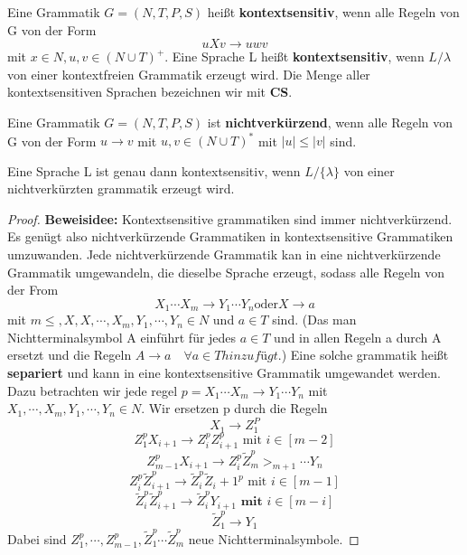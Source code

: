     Eine Grammatik \(G = (N, T, P, S)\) heißt \textbf{kontextsensitiv}, wenn alle Regeln von G von der Form 
    \[
        uXv \to uwv    
    \]
    mit \(x \in N, u,v \in (N \cup T)^+\). Eine Sprache L heißt \textbf{kontextsensitiv}, wenn \(L/{\lambda}\) von einer kontextfreien Grammatik erzeugt wird. Die Menge aller kontextsensitiven Sprachen bezeichnen wir mit \textbf{CS}.
    
    Eine Grammatik \(G = (N, T, P, S)\) ist \textbf{nichtverkürzend}, wenn alle Regeln von G von der Form \(u \to v\) mit \(u,v \in (N \cup T)^* \) mit \(|u| \leq |v|\) sind.

    Eine Sprache L ist genau dann kontextsensitiv, wenn \(L / \{\lambda\}\) von einer nichtverkürzten grammatik erzeugt wird.
    \begin{proof}
        \textbf{Beweisidee: } Kontextsensitive grammatiken sind immer nichtverkürzend. Es genügt also nichtverkürzende Grammatiken in kontextsensitive Grammatiken umzuwanden. Jede nichtverkürzende Grammatik kan in eine nichtverkürzende Grammatik umgewandeln, die dieselbe Sprache erzeugt, sodass alle Regeln von der From 
        \[
            X_1 \cdots X_m \to Y_1 \cdots Y_n \text{oder} X \to a   
        \]
        mit \(m\leq, X, X,\cdots,X_m, Y_1,\cdots, Y_n \in N\) und \(a \in T\) sind. (Das man Nichtterminalsymbol A einführt für jedes \(a \in T\) und in allen Regeln a durch A ersetzt und die Regeln \(A \to a \quad \forall a \in T hinzufügt\).) Eine solche grammatik heißt \textbf{separiert} und kann in eine kontextsensitive Grammatik umgewandet werden. Dazu betrachten wir jede regel \(p = X_1 \cdots X_m \to Y_1\cdots Y_n\) mit \(X_1,\cdots, X_m, Y_1, \cdots, Y_n \in N\). Wir ersetzen p durch die Regeln 
        \[
            X_1 \to Z_1^P
        \]
        \[
            Z_1^p X_{i+1} \to Z_i^p Z_{i+1}^p \text{ mit } i \in [m-2]    
        \]
        \[
              Z_{m-1}^p X_{i+1} \to Z_i^p \tilde{Z}^p_{m}>_{m+1}\cdots Y_n
        \]
        \[
            Z_i^p \tilde{Z}_{i+1}^p \to \tilde{Z}_i^p \tilde{Z}_i+1^p \text{ mit } i \in [m-1]   
        \]
        \[
            \tilde{Z}_i^p \tilde{Z}_{i+1}^p \to \tilde{Z}_i^p Y_{i+1} \textbf{ mit } i \in [m-i]
        \]
        \[
            \tilde{Z}_1^p \to Y_1    
        \]
        Dabei sind \(Z_1^p,\cdots, Z_{m-1}^p, \tilde{Z}^p_1 \cdots \tilde{Z}_m^p\) neue Nichtterminalsymbole.
    \end{proof} 

